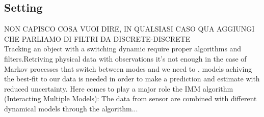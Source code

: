 \documentclass{article}
\begin{document}
\begin{multicols}{2}
    \section*{Setting}
    \justify
    NON CAPISCO COSA VUOI DIRE, IN QUALSIASI CASO QUA AGGIUNGI CHE PARLIAMO DI FILTRI DA DISCRETE-DISCRETE
    \\
    Tracking an object with a switching dynamic require proper algorithms and filters.Retriving physical data with
    observations it's not enough in the case of Markov processes that switch between modes and we need to
    , models achiving the best-fit to our data is needed in order to make a prediction and estimate
    with reduced uncertainty. Here comes to play a major role the IMM algorithm (Interacting Multiple Models): The data
    from sensor are combined with different dynamical models through the algorithm...

\end{multicols}
\end{document}
